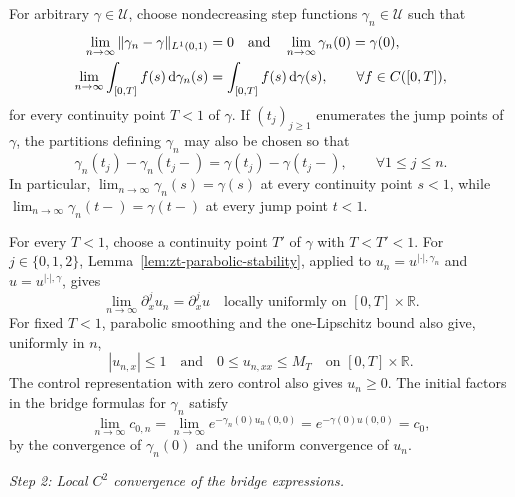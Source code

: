 \documentclass[10pt]{amsart}
\theoremstyle{definition}
\theoremstyle{remark}
\numberwithin{equation}{section}
\newcommand{\R}{\mathbb R}
\newcommand{\1}{\mathbf 1}
\newcommand{\cU}{\mathcal U}
\begin{document}
For arbitrary $\gamma\in\cU$, choose nondecreasing step functions $\gamma_n\in\cU$ such that
\begin{align}
 \lim_{n\to\infty}\|\gamma_n-\gamma\|_{L^1(0,1)}&=0
 \quad\text{and}\quad \lim_{n\to\infty}\gamma_n(0)=\gamma(0),\notag\\
 \lim_{n\to\infty}\int_{[0,T]}f(s)\,\mathrm d\gamma_n(s)
 &=\int_{[0,T]}f(s)\,\mathrm d\gamma(s),
 \qquad \forall f\in C([0,T]),
 \label{eq:zt-gamma-weak-Q}
\end{align}
for every continuity point $T<1$ of $\gamma$. If $(t_j)_{j\geq1}$ enumerates the jump points of $\gamma$, the partitions defining $\gamma_n$ may also be chosen so that
\begin{equation*}
 \gamma_n(t_j)-\gamma_n(t_j-)=\gamma(t_j)-\gamma(t_j-),
 \qquad \forall 1\leq j\leq n.
\end{equation*}
In particular, $\lim_{n\to\infty}\gamma_n(s)=\gamma(s)$ at every continuity point $s<1$, while $\lim_{n\to\infty}\gamma_n(t-)=\gamma(t-)$ at every jump point $t<1$.

For every $T<1$, choose a continuity point $T'$ of $\gamma$ with $T<T'<1$. For $j\in\{0,1,2\}$, Lemma~\ref{lem:zt-parabolic-stability}, applied to $u_n=u^{|\cdot|,\gamma_n}$ and $u=u^{|\cdot|,\gamma}$, gives
\begin{equation}
 \lim_{n\to\infty}\partial_x^ju_n=\partial_x^ju
 \quad\text{locally uniformly on }[0,T]\times\R.
 \label{eq:zt-un-smooth-Q}
\end{equation}
For fixed $T<1$, parabolic smoothing and the one-Lipschitz bound also give, uniformly in $n$,
\begin{equation*}
 |u_{n,x}|\leq1\quad\text{and}\quad 0\leq u_{n,xx}\leq M_T
 \quad\text{on }[0,T]\times\R.
\end{equation*}
The control representation with zero control also gives $u_n\geq0$. The initial factors in the bridge formulas for $\gamma_n$ satisfy
\begin{equation}
 \lim_{n\to\infty}c_{0,n}
 =\lim_{n\to\infty}e^{-\gamma_n(0)u_n(0,0)}
 =e^{-\gamma(0)u(0,0)}=c_0,
 \label{eq:zt-c0n-convergence}
\end{equation}
by the convergence of $\gamma_n(0)$ and the uniform convergence of $u_n$.

\smallskip
\noindent\emph{Step 2: Local $C^2$ convergence of the bridge expressions.}
\end{document}
